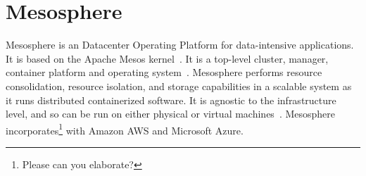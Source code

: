 \section{Mesosphere}

Mesosphere is an Datacenter Operating Platform for 
data-intensive applications. It is based on the Apache Mesos 
kernel~\cite{hid-sp18-404-Concepts2018}. It is a top-level 
cluster, manager, container platform and operating system~\cite{hid-sp18-404-Features2018}. 
Mesosphere performs resource consolidation, resource isolation, 
and storage capabilities in a scalable system as it runs distributed 
containerized software. It is agnostic to the infrastructure level, 
and so can be run on either physical or virtual machines~\cite{hid-sp18-404-Architecture2018}. 
Mesosphere incorporates\footnote{Please can you elaborate?} with Amazon AWS and Microsoft Azure.
